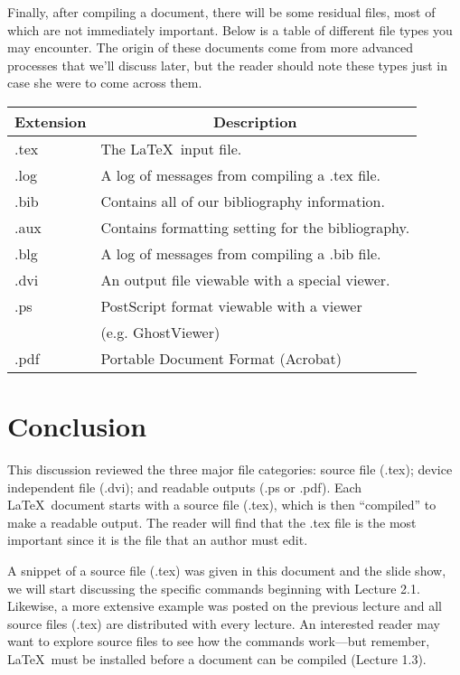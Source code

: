\documentclass{article}
\begin{document}
Finally, after compiling a document, there will be some residual files, most of which are not immediately important. Below is a table of different file types you may encounter. The origin of these documents come from more advanced processes that we'll discuss later, but the reader should note these types just in case she were to come across them.
\begin{center}
	\begin{tabular}{l l}
			\hline
			\multicolumn{1}{c}{Extension}							&	\multicolumn{1}{c}{Description} \\
			\hline
			.tex	&	The \LaTeX\ input file. \\
			.log			&	A log of messages from compiling a .tex file. \\
			.bib		&	Contains all of our bibliography information. \\
			.aux		& Contains formatting setting for the bibliography. \\
			.blg		& A log of messages from compiling a .bib file. \\
			.dvi		&	An output file viewable with a special viewer. \\
			.ps			& PostScript format viewable with a viewer \\
							& (e.g. GhostViewer) \\
			.pdf		& Portable Document Format (Acrobat) \\
			\hline
	\end{tabular}
\end{center}

\section{Conclusion}

This discussion reviewed the three major file categories: source file (.tex); device independent file (.dvi); and readable outputs (.ps or .pdf). Each \LaTeX\ document starts with a source file (.tex), which is then ``compiled'' to make a readable output. The reader will find that the .tex file is the most important since it is the file that an author must edit. 

A snippet of a source file (.tex) was given in this document and the slide show, we will start discussing the specific commands beginning with Lecture 2.1. Likewise, a more extensive example was posted on the previous lecture and all source files (.tex) are distributed with every lecture. An interested reader may want to explore source files to see how the commands work---but remember, \LaTeX\ must be installed before a document can be compiled (Lecture 1.3).
\end{document}
